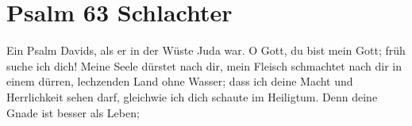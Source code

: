 \documentclass[12pt]{../../inc/mybib}
\author{Lothar Schmid}
\begin{document}
\section{Psalm 63 \small{Schlachter}}
Ein Psalm Davids, als er in der Wüste Juda war. O Gott, du bist mein Gott; früh suche ich dich! Meine Seele dürstet nach dir, mein Fleisch schmachtet nach dir in einem dürren, lechzenden Land ohne Wasser; dass ich deine Macht und Herrlichkeit sehen darf, gleichwie ich dich schaute im Heiligtum. Denn deine Gnade ist besser als Leben;
\end{document}

